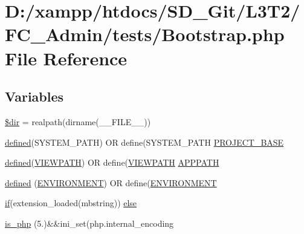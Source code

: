 \hypertarget{_bootstrap_8php}{}\section{D\+:/xampp/htdocs/\+S\+D\+\_\+\+Git/\+L3\+T2/\+F\+C\+\_\+\+Admin/tests/\+Bootstrap.php File Reference}
\label{_bootstrap_8php}
\subsection*{Variables}
\begin{DoxyCompactItemize}
\item 
\hyperlink{_bootstrap_8php_a1659f0a629d408e0f849dbe4ee061e62}{\$dir} = realpath(dirname(\+\_\+\+\_\+\+F\+I\+L\+E\+\_\+\+\_\+))
\item 
\hyperlink{_bootstrap_8php_a46458e8654a714e0565e20f63021add9}{defined}(\textquotesingle{}S\+Y\+S\+T\+E\+M\+\_\+\+P\+A\+T\+H\textquotesingle{}) O\+R define(\textquotesingle{}S\+Y\+S\+T\+E\+M\+\_\+\+P\+A\+T\+H\textquotesingle{} \hyperlink{_bootstrap_8php_a8731a5d504a6592ae43e07a048933c32}{P\+R\+O\+J\+E\+C\+T\+\_\+\+B\+A\+S\+E}
\item 
\hyperlink{_bootstrap_8php_a46458e8654a714e0565e20f63021add9}{defined}(\textquotesingle{}\hyperlink{index_8php_ade8921d52af58583e5727833459224c3}{V\+I\+E\+W\+P\+A\+T\+H}\textquotesingle{}) O\+R define(\textquotesingle{}\hyperlink{index_8php_ade8921d52af58583e5727833459224c3}{V\+I\+E\+W\+P\+A\+T\+H}\textquotesingle{} \hyperlink{_bootstrap_8php_a45cc636071e9edf22e5709d3c18bc84f}{A\+P\+P\+P\+A\+T\+H}
\item 
\hyperlink{_bootstrap_8php_a46458e8654a714e0565e20f63021add9}{defined} (\textquotesingle{}\hyperlink{index_8php_a8757a57d09df5349f8b93b2083e29a1e}{E\+N\+V\+I\+R\+O\+N\+M\+E\+N\+T}\textquotesingle{}) O\+R define(\textquotesingle{}\hyperlink{index_8php_a8757a57d09df5349f8b93b2083e29a1e}{E\+N\+V\+I\+R\+O\+N\+M\+E\+N\+T}\textquotesingle{}
\item 
\hyperlink{assets_2js_2bootstrap_8min_8js_a87cf461060832b8b68a7b48d9e371e4f}{if}(extension\+\_\+loaded(\textquotesingle{}mbstring\textquotesingle{})) \hyperlink{_bootstrap_8php_a67773d041d277deb84668d80e4099034}{else}
\item 
\hyperlink{_bootstrap_8php_acbea7ca989439eea4c6019ad3c5161aa}{is\+\_\+php} (\textquotesingle{}5.\textquotesingle{})\&\&ini\+\_\+set(\textquotesingle{}php.\+internal\+\_\+encoding\textquotesingle{}
\end{DoxyCompactItemize}


